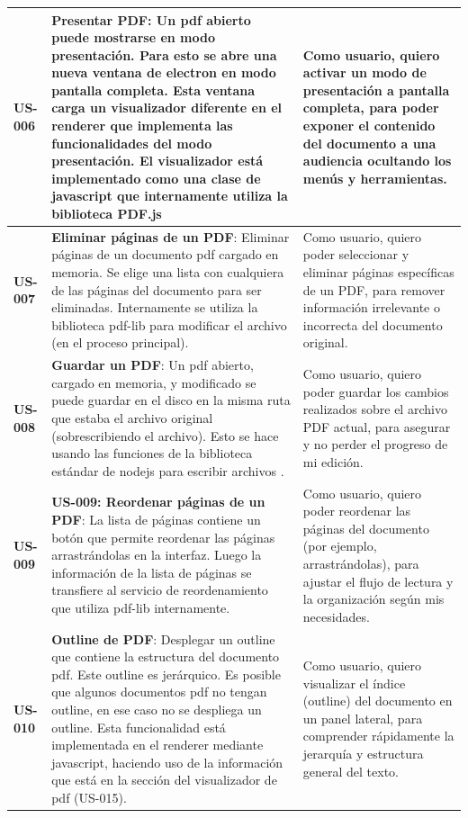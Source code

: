 \begin{longtable}{|l||p{7cm}|p{4.5cm}|}
\hline
\textbf{US-006} & \textbf{Presentar PDF}:  Un pdf abierto puede mostrarse en modo presentación. Para esto se abre una nueva ventana de electron en modo pantalla completa. Esta ventana carga un visualizador diferente en el renderer que implementa las funcionalidades del modo presentación. El visualizador está implementado como una clase de javascript que internamente utiliza la biblioteca PDF.js & Como usuario, quiero activar un modo de presentación a pantalla completa, para poder exponer el contenido del documento a una audiencia ocultando los menús y herramientas.\\
\hline
\textbf{US-007} & \textbf{Eliminar páginas de un PDF}:  Eliminar páginas de un documento pdf cargado en memoria. Se elige una lista con cualquiera de las páginas del documento para ser eliminadas. Internamente se utiliza la biblioteca pdf-lib para modificar el archivo (en el proceso principal). & Como usuario, quiero poder seleccionar y eliminar páginas específicas de un PDF, para remover información irrelevante o incorrecta del documento original.\\
\hline
\hline
\textbf{US-008} & \textbf{Guardar un PDF}:  Un pdf abierto, cargado en memoria, y modificado se puede guardar en el disco en la misma ruta que estaba el archivo original (sobrescribiendo el archivo). Esto se hace usando las funciones de la biblioteca estándar de nodejs para escribir archivos .& Como usuario, quiero poder guardar los cambios realizados sobre el archivo PDF actual, para asegurar y no perder el progreso de mi edición.\\
\hline
\hline
\textbf{US-009} & \textbf{US-009: Reordenar páginas de un PDF}: La lista de páginas contiene un botón que permite reordenar las páginas arrastrándolas en la interfaz. Luego la información de la lista de páginas se transfiere al servicio de reordenamiento que utiliza pdf-lib internamente.  & Como usuario, quiero poder reordenar las páginas del documento (por ejemplo, arrastrándolas), para ajustar el flujo de lectura y la organización según mis necesidades.\\
\hline
\hline
\textbf{US-010} & \textbf{Outline de PDF}:  Desplegar un outline que contiene la estructura del documento pdf. Este outline es jerárquico. Es posible que algunos documentos pdf no tengan outline, en ese caso no se despliega un outline. Esta funcionalidad está implementada en el renderer mediante javascript, haciendo uso de la información que está en la sección del visualizador de pdf (US-015). &  Como usuario, quiero visualizar el índice (outline) del documento en un panel lateral, para comprender rápidamente la jerarquía y estructura general del texto.\\

\end{longtable}

